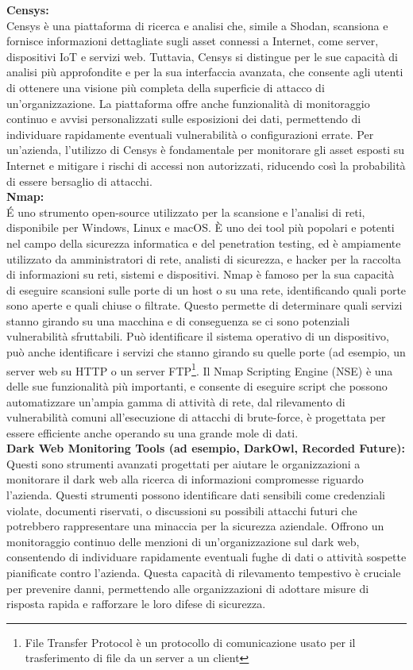 \textbf{Censys:}\\
Censys è una piattaforma di ricerca e analisi che, simile a Shodan, scansiona e fornisce informazioni dettagliate sugli asset connessi a Internet, come server, dispositivi IoT e servizi web. Tuttavia, Censys si distingue per le sue capacità di analisi più approfondite e per la sua interfaccia avanzata, che consente agli utenti di ottenere una visione più completa della superficie di attacco di un'organizzazione. La piattaforma offre anche funzionalità di monitoraggio continuo e avvisi personalizzati sulle esposizioni dei dati, permettendo di individuare rapidamente eventuali vulnerabilità o configurazioni errate. Per un'azienda, l'utilizzo di Censys è fondamentale per monitorare gli asset esposti su Internet e mitigare i rischi di accessi non autorizzati, riducendo così la probabilità di essere bersaglio di attacchi.\\


\textbf{Nmap:}\\
\'E uno strumento open-source utilizzato per la scansione e l'analisi di reti, disponibile per Windows, Linux e macOS. È uno dei tool più popolari e potenti nel campo della sicurezza informatica e del penetration testing, ed è ampiamente utilizzato da amministratori di rete, analisti di sicurezza, e hacker per la raccolta di informazioni su reti, sistemi e dispositivi.
Nmap è famoso per la sua capacità di eseguire scansioni sulle porte di un host o su una rete, identificando quali porte sono aperte e quali chiuse o filtrate. Questo permette di determinare quali servizi stanno girando su una macchina e di conseguenza se ci sono potenziali vulnerabilità sfruttabili. Può identificare il sistema operativo di un dispositivo, può anche identificare i servizi che stanno girando su quelle porte (ad esempio, un server web su HTTP o un server FTP\footnote{File Transfer Protocol è un protocollo di comunicazione usato per il trasferimento di file da un server a un client}.
Il Nmap Scripting Engine (NSE) è una delle sue funzionalità più importanti, e consente di eseguire script che possono automatizzare un'ampia gamma di attività di rete, dal rilevamento di vulnerabilità comuni all'esecuzione di attacchi di brute-force, è progettata per essere efficiente anche operando su una grande mole di dati.\\


\textbf{Dark Web Monitoring Tools (ad esempio, DarkOwl, Recorded Future):}\\
Questi sono strumenti avanzati progettati per aiutare le organizzazioni a monitorare il dark web alla ricerca di informazioni compromesse riguardo l'azienda. Questi strumenti possono identificare dati sensibili come credenziali violate, documenti riservati, o discussioni su possibili attacchi futuri che potrebbero rappresentare una minaccia per la sicurezza aziendale.
Offrono un monitoraggio continuo delle menzioni di un'organizzazione sul dark web, consentendo di individuare rapidamente eventuali fughe di dati o attività sospette pianificate contro l'azienda. Questa capacità di rilevamento tempestivo è cruciale per prevenire danni, permettendo alle organizzazioni di adottare misure di risposta rapida e rafforzare le loro difese di sicurezza.\\


